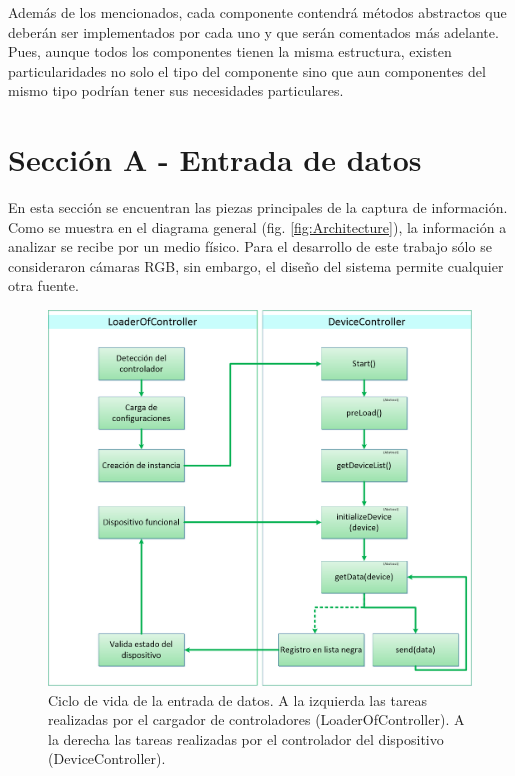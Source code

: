     Además de los mencionados, cada componente contendrá métodos abstractos que deberán ser implementados por cada uno y que serán comentados más adelante. Pues, aunque todos los componentes tienen la misma estructura, existen particularidades no solo el tipo del componente sino que aun componentes del mismo tipo podrían tener sus necesidades particulares.
    
    \newpage
    
\section{Sección A - Entrada de datos}
\label{Sec:InputData}
    En esta sección se encuentran las piezas principales de la captura de información. Como se muestra en el diagrama general (fig. \ref{fig:Architecture}), la información a analizar se recibe por un medio físico. Para el desarrollo de este trabajo sólo se consideraron cámaras RGB, sin embargo, el diseño del sistema permite cualquier otra fuente. 
    
        \begin{figure}[ht!]
        	\centering
        	\includegraphics[width=0.9\linewidth]{imgs/03-Architecture/03-InputDataLifeCicle.png}
        	\caption[Ciclo de vida de la entrada de datos]{Ciclo de vida de la entrada de datos. A la izquierda las tareas realizadas por el cargador de controladores (LoaderOfController). A la derecha las tareas realizadas por el controlador del dispositivo (DeviceController).}
    	    \label{fig:InputDataLifeCicle}
        \end{figure}%
    

